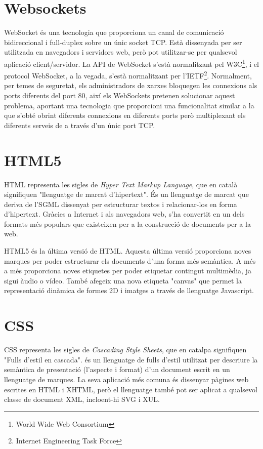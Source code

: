 \section{Websockets}

WebSocket és una tecnologia que proporciona un canal de comunicació bidireccional i full-duplex sobre un únic socket TCP. Està dissenyada per ser utilitzada en navegadors i servidors web, però pot utilitzar-se per qualsevol aplicació client/servidor. La API de WebSocket s'està normalitzant pel W3C\footnote{World Wide Web Consortium}, i el protocol WebSocket, a la vegada, s'està normalitzant per l'IETF\footnote{Internet Engineering Task Force}. Normalment, per temes de seguretat, els administradors de xarxes bloquegen les connexions als ports diferents del port 80, així els WebSockets pretenen solucionar aquest problema, aportant una tecnologia que proporcioni una funcionalitat similar a la que s'obté obrint diferents connexions en diferents ports però multiplexant els diferents serveis de a través d'un únic port TCP.

\section{HTML5}

HTML representa les sigles de \emph{Hyper Text Markup Language}, que en català signifiquen "llenguatge de marcat d'hipertext". És un llenguatge de marcat que deriva de l'SGML dissenyat per estructurar textos i relacionar-los en forma d'hipertext. Gràcies a Internet i als navegadors web, s'ha convertit en un dels formats més populars que existeixen per a la construcció de documents per a la web. 

HTML5 és la última versió de HTML. Aquesta última versió proporciona noves marques per poder estructurar els documents d'una forma més semàntica. A més a més proporciona noves etiquetes per poder etiquetar contingut multimèdia, ja sigui àudio o vídeo. També afegeix una nova etiqueta "canvas" que permet la representació dinàmica de formes 2D i imatges a través de llenguatge Javascript. 

\section{CSS}

CSS representa les sigles de \emph{Cascading Style Sheets}, que en catalpa signifiquen "Fulls d'estil en cascada". és un llenguatge de fulls d'estil utilitzat per descriure la semàntica de presentació (l'aspecte i format) d'un document escrit en un llenguatge de marques. La seva aplicació més comuna és dissenyar pàgines web escrites en HTML i XHTML, però el llenguatge també pot ser aplicat a qualsevol classe de document XML, incloent-hi SVG i XUL.


